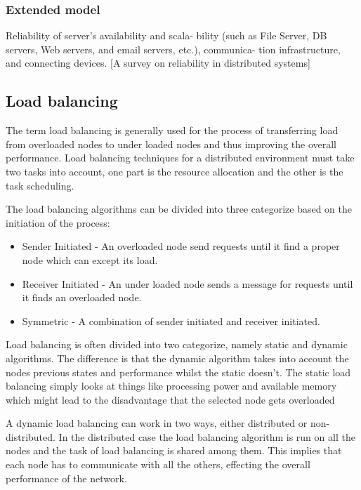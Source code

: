 \documentclass{cslthse-msc}
\begin{document}
\subsubsection{Extended model}
Reliability of server’s availability and scala- bility (such as File Server, DB servers, Web servers, and email servers, etc.), communica- tion infrastructure, and connecting devices. [A survey on reliability in distributed systems]

\subsection{Load balancing}
The term load balancing is generally used for the process of transferring load from overloaded nodes to under loaded nodes and thus improving the overall performance. Load balancing techniques for a distributed environment must take two tasks into account, one part is the resource allocation and the other is the task scheduling. 

The load balancing algorithms can be divided into three categorize based on the initiation of the process:
\begin{itemize}
\item Sender Initiated - An overloaded node send requests until it find a proper node which can except its load.
\item Receiver Initiated - An under loaded node sends a message for requests until it finds an overloaded node.
\item Symmetric - A combination of sender initiated and receiver initiated. 
\end{itemize}

Load balancing is often divided into two categorize, namely static and dynamic algorithms. The difference is that the dynamic algorithm takes into account the nodes previous states and performance whilst the static doesn't. The static load balancing simply looks at things like processing power and available memory which might lead to the disadvantage that the selected node gets overloaded \cite{perfAnalysisLoadCloud}

A dynamic load balancing can work in two ways, either distributed or non-distributed. In the distributed case the load balancing algorithm is run on all the nodes and the task of load  balancing is shared among them. This implies that each node has to communicate with all the others, effecting the overall performance of the network. %
\end{document}
